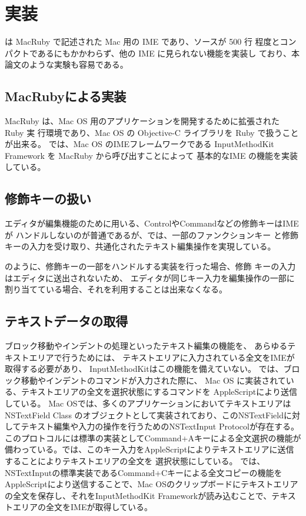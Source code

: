 \section{実装}

{\system} は MacRuby で記述された Mac 用の IME であり、ソースが 500 行
程度とコンパクトであるにもかかわらず、他の IME に見られない機能を実装し
ており、本論文のような実験も容易である。

\subsection{MacRubyによる実装}

MacRuby は、Mac OS 用のアプリケーションを開発するために拡張された Ruby 実
行環境であり、Mac OS の Objective-C ライブラリを Ruby で扱うことが出来る。
%
{\system} では、Mac OS のIMEフレームワークである
InputMethodKit Framework を MacRuby から呼び出すことによって
基本的なIME の機能を実装している。

\subsection{修飾キーの扱い}

エディタが編集機能のために用いる、ControlやCommandなどの修飾キーはIMEが
ハンドルしないのが普通であるが、{\system}では、一部のファンクションキー
と修飾キーの入力を受け取り、共通化されたテキスト編集操作を実現している。

{\system} のように、修飾キーの一部をハンドルする実装を行った場合、修飾
キーの入力はエディタに送出されないため、
エディタが同じキー入力を編集操作の一部に割り当てている場合、それを利用することは出来なくなる。

\subsection{テキストデータの取得}

ブロック移動やインデントの処理といったテキスト編集の機能を、
あらゆるテキストエリアで行うためには、
テキストエリアに入力されている全文をIMEが取得する必要があり、
InputMethodKitはこの機能を備えていない。
%
{\system} では、ブロック移動やインデントのコマンドが入力された際に、
Mac OS に実装されている、テキストエリアの全文を選択状態にするコマンドを
AppleScriptにより送信している。
Mac OSでは、多くのアプリケーションにおいてテキストエリアはNSTextField Class のオブジェクトとして実装されており、このNSTextFieldに対してテキスト編集や入力の操作を行うためのNSTextInput Protocolが存在する。
このプロトコルには標準の実装としてCommand+Aキーによる全文選択の機能が備わっている。{\system}では、このキー入力をAppleScriptによりテキストエリアに送信することによりテキストエリアの全文を
選択状態にしている。
%
{\system}では、NSTextInputの標準実装であるCommand+Cキーによる全文コピーの機能をAppleScriptにより送信することで、Mac OSのクリップボードにテキストエリアの全文を保存し、それをInputMethodKit Frameworkが読み込むことで、テキストエリアの全文をIMEが取得している。
%

